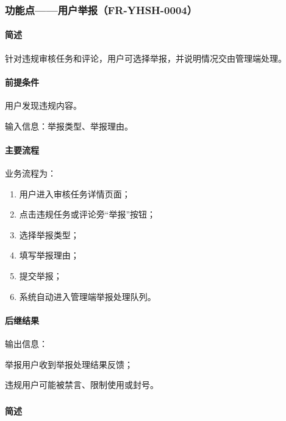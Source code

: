 {\color{black}
\subsubsection{功能点——用户举报（FR-YHSH-0004）}

\paragraph*{简述}

针对违规审核任务和评论，用户可选择举报，并说明情况交由管理端处理。

\paragraph*{前提条件}

用户发现违规内容。

输入信息：举报类型、举报理由。

\paragraph*{主要流程}

业务流程为：

\begin{enumerate}
    \item 用户进入审核任务详情页面；
    \item 点击违规任务或评论旁“举报”按钮；
    \item 选择举报类型；
    \item 填写举报理由；
    \item 提交举报；
    \item 系统自动进入管理端举报处理队列。
\end{enumerate}

\paragraph*{后继结果}

输出信息：

举报用户收到举报处理结果反馈；

违规用户可能被禁言、限制使用或封号。
}

\subsubsection{}

\paragraph*{简述}

